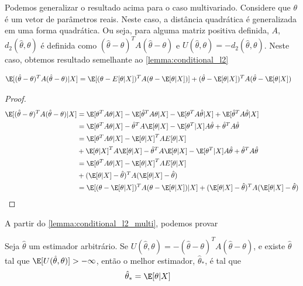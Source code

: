 Podemos generalizar o resultado acima para 
o caso multivariado. Considere que 
$\theta$ é um vetor de parâmetros reais.
Neste caso, a distância quadrática é 
generalizada em uma forma quadrática.
Ou seja, para alguma matriz positiva definida, $A$, 
$d_{2}(\hat{\theta},\theta)$ é
definida como 
$(\hat{\theta}-\theta)^{T}A(\hat{\theta}-\theta)$ e $U(\hat{\theta},\theta) = -d_{2}(\hat{\theta},\theta)$.
Neste caso, obtemos resultado semelhante 
ao \cref{lemma:conditional_l2}
\begin{lemma}
 \label{lemma:conditional_l2_multi}
 \begin{align*}
  \E[(\hat{\theta}-\theta)^{T}A(\hat{\theta}-\theta)|X]	
  &= \E[(\theta-E[\theta|X])^{T}A(\theta-\E[\theta|X])] 
  +(\hat{\theta}-\E[\theta|X])^{T}A(\hat{\theta}-\E[\theta|X])
 \end{align*}
\end{lemma}
\begin{proof}
 \begin{align*}
  \E[(\hat{\theta}-\theta)^{T}A(\hat{\theta}-\theta)|X]	
  &= \E[\theta^{T}A\theta|X]
  -\E[\hat{\theta}^{T}A\theta|X]
  -\E[\theta^{T}A\hat{\theta}|X]
  +\E[\hat{\theta}^{T}A\hat{\theta}|X] \\
  &= \E[\theta^{T}A\theta|X]-\hat{\theta}^{T}A\E[\theta|X]
  -\E[\theta^{T}|X]A\hat{\theta}
  +\hat{\theta}^{T}A\hat{\theta} \\
  &= \E[\theta^{T}A\theta|X]
  -\E[\theta|X]^{T}AE[\theta|X]	\\
  &+ \E[\theta|X]^{T}A\E[\theta|X]
  -\hat{\theta}^{T}A\E[\theta|X]
  -\E[\theta^{T}|X]A\hat{\theta}
  +\hat{\theta}^{T}A\hat{\theta} \\
  &= \E[\theta^{T}A\theta|X]
  -\E[\theta|X]^{T}AE[\theta|X]	\\
  &+ (\E[\theta|X]-\hat{\theta})^{T}A(\E[\theta|X]-\hat{\theta}) \\
  &= \E[(\theta-\E[\theta|X])^{T}A(\theta-\E[\theta|X])|X]
  +(\E[\theta|X]-\hat{\theta})^{T}A(\E[\theta|X]-\hat{\theta})
 \end{align*}
\end{proof}
A partir do \cref{lemma:conditional_l2_multi},
podemos provar
\begin{theorem}
 \label{thm:estimation_l2_multi}
 Seja $\hat{\theta}$ um estimador arbitrário.
 Se $U(\hat{\theta},\theta) = -(\hat{\theta}-\theta)^{T}A(\hat{\theta}-\theta)$, e 
 existe $\hat{\theta}$ tal que 
 $\E[U(\hat{\theta},\theta)] > -\infty$,
 então o melhor estimador, $\hat{\theta}_{*}$, 
 é tal que
 \begin{align*}
  \hat{\theta}_{*}	&= \E[\theta|X]
 \end{align*}
\end{theorem}

